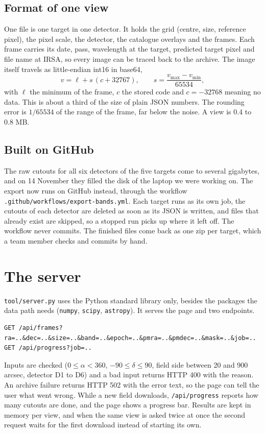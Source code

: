 \documentclass[11pt,a4paper]{article}
\begin{document}
\subsection{Format of one view}
One file is one target in one detector. It holds the grid (centre, size, reference pixel), the
pixel scale, the detector, the catalogue overlays and the frames. Each frame carries its date,
pass, wavelength at the target, predicted target pixel and file name at IRSA, so every image can
be traced back to the archive. The image itself travels as little-endian int16 in base64,
\begin{equation}
  v = \ell + s\,(c + 32767), \qquad s = \frac{v_\mathrm{max} - v_\mathrm{min}}{65534},
\end{equation}
with $\ell$ the minimum of the frame, $c$ the stored code and $c = -32768$ meaning no data. This
is about a third of the size of plain JSON numbers. The rounding error is $1/65534$ of the range
of the frame, far below the noise. A view is 0.4 to 0.8 MB.

\subsection{Built on GitHub}
The raw cutouts for all six detectors of the five targets come to several gigabytes, and on
14 November they filled the disk of the laptop we were working on. The export now runs on
GitHub instead, through the workflow \texttt{.github/workflows/export-bands.yml}. Each target
runs as its own job, the cutouts of each detector are deleted as soon as its JSON is written,
and files that already exist are skipped, so a stopped run picks up where it left off. The
workflow never commits. The finished files come back as one zip per target, which a team member
checks and commits by hand.

\section{The server}\label{sec:server}

\texttt{tool/server.py} uses the Python standard library only, besides the packages the data
path needs (\texttt{numpy}, \texttt{scipy}, \texttt{astropy}). It serves the page and two
endpoints.
\begin{lstlisting}
GET /api/frames?ra=..&dec=..&size=..&band=..&epoch=..&pmra=..&pmdec=..&mask=..&job=..
GET /api/progress?job=..
\end{lstlisting}
Inputs are checked ($0 \le \alpha < 360$, $-90 \le \delta \le 90$, field side between 20 and
900 arcsec, detector D1 to D6) and a bad input returns HTTP 400 with the reason. An archive
failure returns HTTP 502 with the error text, so the page can tell the user what went wrong.
While a new field downloads, \texttt{/api/progress} reports how many cutouts are done, and the
page shows a progress bar. Results are kept in memory per view, and when the same view is asked
twice at once the second request waits for the first download instead of starting its own.
\end{document}
